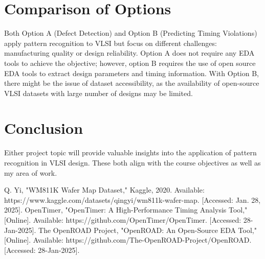 \documentclass[conference]{IEEEtran}
\begin{document}



\section{Comparison of Options}
Both Option A (Defect Detection) and Option B (Predicting Timing Violations) apply pattern recognition to VLSI but focus on different challenges: manufacturing quality or design reliability.
Option A does not require any EDA tools to achieve the objective; however, option B requires the use of open source EDA tools to extract design parameters and timing information.
With Option B, there might be the issue of dataset accessibility, as the availability of open-source VLSI datasets with large number of designs may be limited.

\section{Conclusion}
Either project topic will provide valuable insights into the application of pattern recognition in VLSI design. These both align with the course objectives as well as my area of work.

\begin{thebibliography}{00}
 Q. Yi, "WM811K Wafer Map Dataset," Kaggle, 2020. Available: https://www.kaggle.com/datasets/qingyi/wm811k-wafer-map. [Accessed: Jan. 28, 2025].
 OpenTimer, "OpenTimer: A High-Performance Timing Analysis Tool," [Online]. Available: https://github.com/OpenTimer/OpenTimer. [Accessed: 28-Jan-2025].
 The OpenROAD Project, "OpenROAD: An Open-Source EDA Tool," [Online]. Available: https://github.com/The-OpenROAD-Project/OpenROAD. [Accessed: 28-Jan-2025].
\end{thebibliography}
\end{document}
